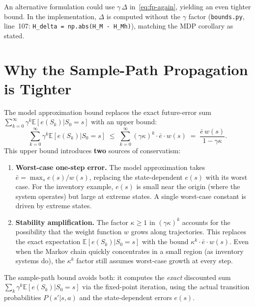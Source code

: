 \documentclass[11pt]{article}
\begin{document}
An alternative formulation could use $\gamma\,\Delta$ in~\eqref{eq:fp-again},
yielding an even tighter bound.  In the implementation, $\Delta$ is
computed without the $\gamma$ factor (\texttt{bounds.py}, line~107:
\texttt{H\_delta = np.abs(H\_M - H\_Mh)}), matching the MDP corollary as
stated.

\section{Why the Sample-Path Propagation is Tighter}

The model approximation bound replaces the exact future-error sum
$\sum_{k=0}^\infty \gamma^k \mathbb{E}[e(S_k)|S_0=s]$ with an upper bound:
\[
  \sum_{k=0}^{\infty} \gamma^k \mathbb{E}[e(S_k)|S_0=s]
  \;\le\;
  \sum_{k=0}^{\infty} (\gamma\kappa)^k \cdot \bar{e} \cdot w(s)
  \;=\; \frac{\bar{e}\, w(s)}{1-\gamma\kappa}.
\]
This upper bound introduces \textbf{two} sources of conservatism:

\begin{enumerate}
\item \textbf{Worst-case one-step error.}
The model approximation takes $\bar{e} = \max_s e(s)/w(s)$, replacing the
state-dependent $e(s)$ with its worst case.  For the inventory example, $e(s)$
is small near the origin (where the system operates) but large at extreme
states.  A single worst-case constant is driven by extreme states.

\item \textbf{Stability amplification.}
The factor $\kappa \ge 1$ in $(\gamma\kappa)^k$ accounts for the possibility
that the weight function $w$ grows along trajectories.  This replaces the exact
expectation $\mathbb{E}[e(S_k)|S_0=s]$ with the bound
$\kappa^k \cdot \bar{e} \cdot w(s)$.  Even when the Markov chain quickly
concentrates in a small region (as inventory systems do), the $\kappa^k$ factor
still assumes worst-case growth at every step.
\end{enumerate}

The sample-path bound avoids both: it computes the \emph{exact} discounted sum
$\sum_k \gamma^k \mathbb{E}[e(S_k)|S_0=s]$ via the fixed-point iteration,
using the actual transition probabilities $P(s'|s,a)$ and the state-dependent
errors $e(s)$.

\medskip
\end{document}
